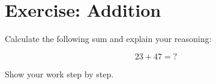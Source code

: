 \documentclass{article}
\begin{document}
\section*{Exercise: Addition}

Calculate the following sum and explain your reasoning:

$$23 + 47 = ?$$

Show your work step by step.
\end{document}
